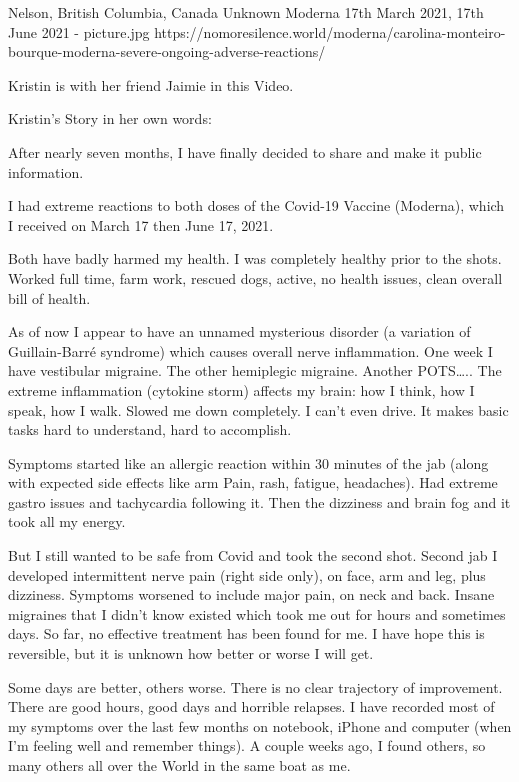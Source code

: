 {Nelson, British Columbia, Canada}
{Unknown}
{Moderna}
{17th March 2021, 17th June 2021}
{-}
{picture.jpg}
{https://nomoresilence.world/moderna/carolina-monteiro-bourque-moderna-severe-ongoing-adverse-reactions/}
{

\normalsize

Kristin is with her friend Jaimie in this Video.

Kristin’s Story in her own words:

After nearly seven months, I have finally decided to share and make it public
information.

I had extreme reactions to both doses of the Covid-19 Vaccine (Moderna), which I
received on March 17 then June 17, 2021.

Both have badly harmed my health. I was completely healthy prior to the
shots. Worked full time, farm work, rescued dogs, active, no health issues,
clean overall bill of health.

As of now I appear to have an unnamed mysterious disorder (a variation of
Guillain-Barré syndrome) which causes overall nerve inflammation. One week I
have vestibular migraine. The other hemiplegic migraine. Another POTS….. The
extreme inflammation (cytokine storm) affects my brain: how I think, how I
speak, how I walk. Slowed me down completely. I can’t even drive. It makes basic
tasks hard to understand, hard to accomplish.

Symptoms started like an allergic reaction within 30 minutes of the jab (along
with expected side effects like arm Pain, rash, fatigue, headaches). Had extreme
gastro issues and tachycardia following it. Then the dizziness and brain fog and
it took all my energy.

But I still wanted to be safe from Covid and took the second shot. Second jab I
developed intermittent nerve pain (right side only), on face, arm and leg, plus
dizziness. Symptoms worsened to include major pain, on neck and back. Insane
migraines that I didn’t know existed which took me out for hours and sometimes
days. So far, no effective treatment has been found for me. I have hope this is
reversible, but it is unknown how better or worse I will get.

Some days are better, others worse. There is no clear trajectory of
improvement. There are good hours, good days and horrible relapses. I have
recorded most of my symptoms over the last few months on notebook, iPhone and
computer (when I’m feeling well and remember things). A couple weeks ago, I
found others, so many others all over the World in the same boat as me.

}
